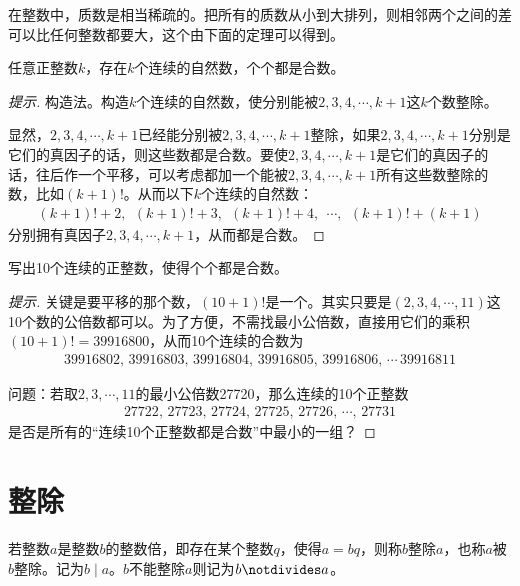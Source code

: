 在整数中，质数是相当稀疏的。把所有的质数从小到大排列，则相邻两个之间的差可以比任何整数都要大，这个由下面的定理可以得到。
\begin{theorem}
  任意正整数$k$，存在$k$个连续的自然数，个个都是合数。
\end{theorem}
\begin{proof}[提示]
  构造法。构造$k$个连续的自然数，使分别能被$2,3,4,\cdots,k+1$这$k$个数整除。

  显然，$2,3,4,\cdots,k+1$已经能分别被$2,3,4,\cdots,k+1$整除，如果$2,3,4,\cdots,k+1$分别是它们的真因子的话，则这些数都是合数。要使$2,3,4,\cdots,k+1$是它们的真因子的话，往后作一个平移，可以考虑都加一个能被$2,3,4,\cdots,k+1$所有这些数整除的数，比如$(k+1)!$。从而以下$k$个连续的自然数：
  \begin{align*}
    (k+1)!+2,\ \ (k+1)!+3,\ \ (k+1)!+4,\ \ \cdots,\ \ (k+1)!+(k+1)
  \end{align*}
  分别拥有真因子$2,3,4,\cdots,k+1$，从而都是合数。
\end{proof}

\begin{example}[上海，1957]
  写出10个连续的正整数，使得个个都是合数。
\end{example}
\begin{proof}[提示]
  关键是要平移的那个数，$(10+1)!$是一个。其实只要是$(2,3,4,\cdots,11)$这10个数的公倍数都可以。为了方便，不需找最小公倍数，直接用它们的乘积$(10+1)!=39916800$，从而10个连续的合数为
  \begin{align*}
    39916802,\, 39916803,\, 39916804,\, 39916805,\, 39916806,\, \cdots\, 39916811
  \end{align*}

  问题：若取$2,3,\cdots,11$的最小公倍数27720，那么连续的10个正整数
  \begin{align*}
    27722,\, 27723,\, 27724,\, 27725,\, 27726,\, \cdots,\, 27731
  \end{align*}
  是否是所有的“连续10个正整数都是合数”中最小的一组？
\end{proof}


\section{整除}
\label{sec:divisible}

\begin{definition}
  若整数$a$是整数$b$的整数倍，即存在某个整数$q$，使得$a=bq$，则称$b$整除$a$，也称$a$被$b$整除。记为$b\mid a$。$b$不能整除$a$则记为$b\notdivides a$。
\end{definition}

